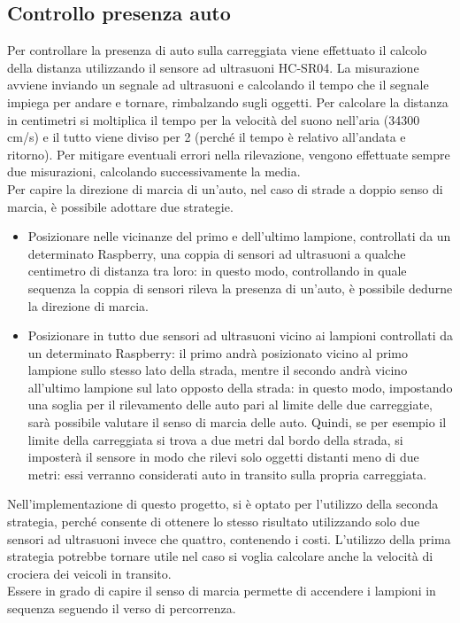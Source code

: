 \subsection{Controllo presenza auto \label{cpa}}
Per controllare la presenza di auto sulla carreggiata viene effettuato il calcolo della distanza utilizzando il sensore ad ultrasuoni HC-SR04.
La misurazione avviene inviando un segnale ad ultrasuoni e calcolando il tempo che il segnale impiega per andare e tornare, rimbalzando sugli oggetti.
Per calcolare la distanza in centimetri si moltiplica il tempo per la velocità del suono nell'aria (34300 cm/s) e il tutto viene diviso per 2 (perché il tempo è relativo all'andata e ritorno).
Per mitigare eventuali errori nella rilevazione, vengono effettuate sempre due misurazioni, calcolando successivamente la media.
\\Per capire la direzione di marcia di un'auto, nel caso di strade a doppio senso di marcia, è possibile adottare due strategie.
\begin{itemize}
 \item Posizionare nelle vicinanze del primo e dell'ultimo lampione, controllati da un determinato Raspberry, una coppia di sensori ad ultrasuoni a qualche centimetro di distanza tra loro: in questo modo, controllando in quale sequenza la coppia di sensori rileva la presenza di un'auto, è possibile dedurne la direzione di marcia.
 \item Posizionare in tutto due sensori ad ultrasuoni vicino ai lampioni controllati da un determinato Raspberry: il primo andrà posizionato vicino al primo lampione sullo stesso lato della strada, mentre il secondo andrà vicino all'ultimo lampione sul lato opposto della strada:
 in questo modo, impostando una soglia per il rilevamento delle auto pari al limite delle due carreggiate, sarà possibile valutare il senso di marcia delle auto.
 Quindi, se per esempio il limite della carreggiata si trova a due metri dal bordo della strada, si imposterà il sensore in modo che rilevi solo oggetti distanti meno di due metri: essi verranno considerati auto in transito sulla propria carreggiata.
\end{itemize}
Nell'implementazione di questo progetto, si è optato per l'utilizzo della seconda strategia, perché consente di ottenere lo stesso risultato utilizzando solo due sensori ad ultrasuoni invece che quattro, contenendo i costi.
L'utilizzo della prima strategia potrebbe tornare utile nel caso si voglia calcolare anche la velocità di crociera dei veicoli in transito.
\\Essere in grado di capire il senso di marcia permette di accendere i lampioni in sequenza seguendo il verso di percorrenza.
